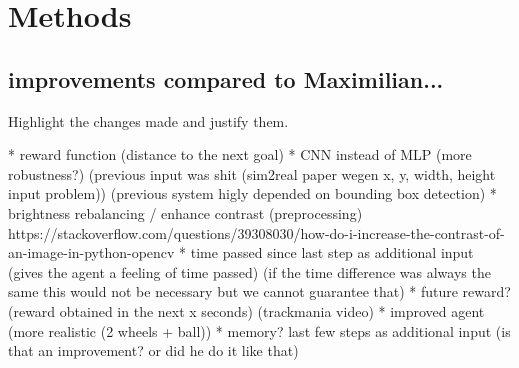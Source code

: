 \chapter{Methods}
\label{cha:Methods}





\section{improvements compared to Maximilian...}

Highlight the changes made and justify them.

* reward function (distance to the next goal)
* CNN instead of MLP (more robustness?) (previous input was shit (sim2real paper wegen x, y, width, height input problem)) (previous system higly depended on bounding box detection)
* brightness rebalancing / enhance contrast (preprocessing) https://stackoverflow.com/questions/39308030/how-do-i-increase-the-contrast-of-an-image-in-python-opencv
* time passed since last step as additional input (gives the agent a feeling of time passed) (if the time difference was always the same this would not be necessary but we cannot guarantee that)
* future reward? (reward obtained in the next x seconds) (trackmania video)
* improved agent (more realistic (2 wheels + ball))
* memory? last few steps as additional input (is that an improvement? or did he do it like that)

